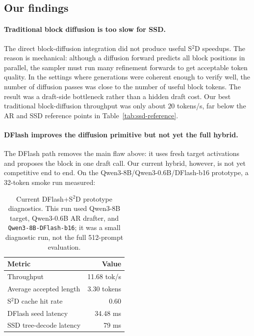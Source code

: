 \subsection{Our findings}

\paragraph{Traditional block diffusion is too slow for SSD.}
The direct block-diffusion integration did not produce useful S$^2$D speedups.
The reason is mechanical: although a diffusion forward predicts all block
positions in parallel, the sampler must run many refinement forwards to get
acceptable token quality. In the settings where generations were coherent
enough to verify well, the number of diffusion passes was close to the number
of useful block tokens. The result was a draft-side bottleneck rather than a
hidden draft cost. Our best traditional block-diffusion throughput was only
about $20$ tokens/s, far below the AR and SSD reference points in
Table~\ref{tab:ssd-reference}.

\paragraph{DFlash improves the diffusion primitive but not yet the full hybrid.}
The DFlash path removes the main flaw above: it uses fresh target activations
and proposes the block in one draft call. Our current hybrid, however, is not
yet competitive end to end. On the Qwen3-8B/Qwen3-0.6B/DFlash-b16 prototype,
a 32-token smoke run measured:

\begin{table}[t]
  \caption{Current DFlash+S$^2$D prototype diagnostics. This run used Qwen3-8B
  target, Qwen3-0.6B AR drafter, and \texttt{Qwen3-8B-DFlash-b16}; it was a
  small diagnostic run, not the full 512-prompt evaluation.}
  \label{tab:prototype}
  \centering
  \footnotesize
  \begin{tabular}{@{}lr@{}}
    \toprule
    Metric & Value \\
    \midrule
    Throughput & 11.68 tok/s \\
    Average accepted length & 3.30 tokens \\
    S$^2$D cache hit rate & 0.60 \\
    DFlash seed latency & 34.48 ms \\
    SSD tree-decode latency & 79 ms \\
    \bottomrule
  \end{tabular}
\end{table}

